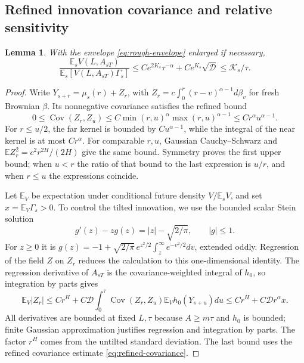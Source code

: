 \documentclass[11pt,a4paper]{amsart}
\theoremstyle{plain}
\newtheorem{lemma}[theorem]{Lemma}
\theoremstyle{definition}
\theoremstyle{remark}
\DeclareMathOperator{\Cov}{Cov}
\newcommand{\EE}{\mathbb{E}}
\newcommand{\Es}{\EE_s}
\begin{document}
\subsection{Refined innovation covariance and relative sensitivity}
\begin{lemma}\label{lem:rough-relative}
With the envelope \eqref{eq:rough-envelope} enlarged if necessary,
\begin{equation}\label{eq:rough-relative}
 \frac{\Es V(L,A_{sT})}{\Es[V(L,A_{sT})\Gamma_s]}
 \le C e^{2K_s}\tau^{-\alpha}+C e^{K_s}\sqrt{\mathscr D}
 \le\mathcal K_s/\tau.
\end{equation}
\end{lemma}
\begin{proof}
Write $Y_{s+r}=\mu_s(r)+Z_r$, with
$Z_r=c\int_0^r(r-v)^{\alpha-1}d\beta_v$ for fresh Brownian $\beta$. Its nonnegative covariance satisfies the refined bound
\begin{equation}\label{eq:refined-covariance}
 0\le\Cov(Z_r,Z_u)
 \le C\min(r,u)^\alpha\max(r,u)^{\alpha-1}
 \le Cr^\alpha u^{\alpha-1}.
\end{equation}
For $r\le u/2$, the far kernel is bounded by $Cu^{\alpha-1}$, while the integral of the near kernel is at most $Cr^\alpha$. For comparable $r,u$, Gaussian Cauchy--Schwarz and
$\EE Z_r^2=c^2r^{2H}/(2H)$ give the same bound. Symmetry proves the first upper bound; when $u<r$ the ratio of that bound to the last expression is $u/r$, and when $r\le u$ the expressions coincide.

Let $\EE_V$ be expectation under conditional future density $V/\Es V$, and set $x=\EE_V\Gamma_s>0$. To control the tilted innovation, we use the bounded scalar Stein solution
\[
 g'(z)-zg(z)=|z|-\sqrt{2/\pi},\qquad |g|\le1.
\]
For $z\ge0$ it is
$g(z)=-1+\sqrt{2/\pi}\,e^{z^2/2}\int_z^\infty e^{-v^2/2}dv$, extended oddly. Regression of the field $Z$ on $Z_r$ reduces the calculation to this one-dimensional identity. The regression derivative of $A_{sT}$ is the covariance-weighted integral of $h_0$, so integration by parts gives
\begin{equation}\label{eq:rough-stein}
 \EE_V|Z_r|\le Cr^H+
 C\mathscr D\int_0^\tau\Cov(Z_r,Z_u)\EE_Vh_0(Y_{s+u})du
 \le Cr^H+C\mathscr D r^\alpha x.
\end{equation}
All derivatives are bounded at fixed $L,\tau$ because $A\ge m\tau$ and $h_0$ is bounded; finite Gaussian approximation justifies regression and integration by parts. The factor $r^H$ comes from the untilted standard deviation. The last bound uses the refined covariance estimate \eqref{eq:refined-covariance}.


\end{proof}
\end{document}
